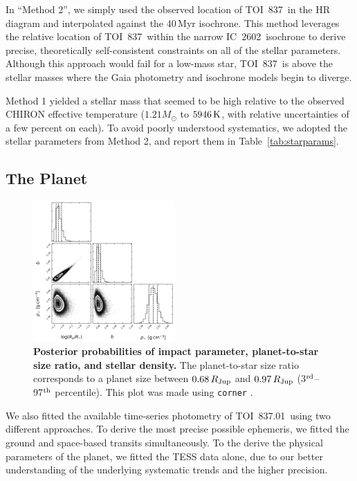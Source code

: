\documentclass[12pt,twocolumn,tighten]{aastex63}
\newcommand{\tn}{TOI~837} %
\newcommand{\pn}{TOI~837.01} %
\newcommand{\cn}{IC~2602} %
\begin{document}
In ``Method 2'', we simply used the observed location of \tn\ in the
HR diagram and interpolated against the 40$\,$Myr isochrone.  This
method leverages the relative location of \tn\ within the narrow \cn\
isochrone to derive precise, theoretically self-consistent constraints
on all of the stellar parameters.  Although this approach would fail
for a low-mass star, \tn\ is above the stellar masses where the Gaia
photometry and isochrone models begin to diverge.

Method 1 yielded a stellar mass that seemed to be high relative to the
observed CHIRON effective temperature ($1.21 M_\odot$ to $5946\,{\rm
K}$, with relative uncertainties of a few percent on each). To avoid
poorly understood systematics,  we adopted the stellar parameters from
Method 2, and report them in Table~\ref{tab:starparams}.



\subsection{The Planet}
\label{subsec:planet}

\begin{figure}[!t]
	\begin{center}
		\leavevmode
		\includegraphics[width=0.48\textwidth]{f10.png}
	\end{center}
	\vspace{-0.5cm}
	\caption{ 
    {\bf Posterior probabilities of impact parameter, planet-to-star
    size ratio, and stellar density.} The  planet-to-star size ratio
    corresponds to a planet size between $0.68\,R_{\rm Jup}$ and
    $0.97\,R_{\rm Jup}$ (3$^{\rm rd}$--97$^{\rm th}$ percentile).
    This plot was made using \texttt{corner} \citep{corner_2016}.
		\label{fig:subsetcorner}
	}
\end{figure}


We also fitted the available time-series photometry of \pn\ using two
different approaches.  To derive the most precise possible ephemeris,
we fitted the ground and space-based transits simultaneously.  To the
derive the physical parameters of the planet, we fitted the TESS data
alone, due to our better understanding of the underlying systematic
trends and the higher precision.
\end{document}
